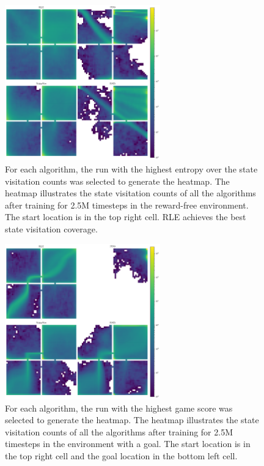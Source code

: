 \begin{figure}[h!]
  \centering
  \includegraphics[width=0.6\textwidth]{figures/gridworld_heatmaps_no_goal_algorithms.pdf}
  \caption{For each algorithm, the run with the highest entropy over the state visitation counts was selected to generate the heatmap. The heatmap illustrates the state visitation counts of all the algorithms after training for 2.5M timesteps in the reward-free environment. The start location is in the top right cell. RLE achieves the best state visitation coverage.}
  \label{fig:gridworld-heatmap-nogoal-algorithms}
\end{figure}

\begin{figure}[h!]
  \centering
  \includegraphics[width=0.6\textwidth]{figures/gridworld_heatmaps_goal_algorithms.pdf}
  \caption{For each algorithm, the run with the highest game score was selected to generate the heatmap. The heatmap illustrates the state visitation counts of all the algorithms after training for 2.5M timesteps in the environment with a goal. The start location is in the top right cell and the goal location in the bottom left cell.}
  \label{fig:gridworld-heatmap-goal-algorithms}
\end{figure}

